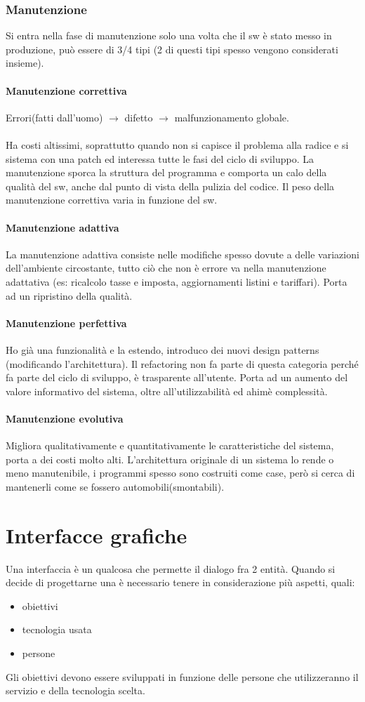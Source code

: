 \documentclass[a4paper,12pt]{report}
\begin{document}
	\subsection{Manutenzione}
	Si entra nella fase di manutenzione solo una volta che il sw è stato messo in produzione, può essere di 3/4 tipi (2 di questi tipi spesso vengono considerati insieme). 
	\subsubsection{Manutenzione correttiva}
	Errori(fatti dall’uomo) $\rightarrow$ difetto $\rightarrow$ malfunzionamento globale. \\\\
	Ha costi altissimi, soprattutto quando non si capisce il problema alla radice e si sistema con una patch ed interessa tutte le fasi del ciclo di sviluppo. La manutenzione sporca la struttura del programma e comporta un calo della qualità del sw, anche dal punto di vista della pulizia del codice. Il peso della manutenzione correttiva varia in funzione del sw.
	\subsubsection{Manutenzione adattiva}
	La manutenzione adattiva consiste nelle modifiche spesso dovute a delle variazioni dell'ambiente circostante, tutto ciò che non è errore va nella manutenzione adattativa (es: ricalcolo tasse e imposta, aggiornamenti listini e tariffari). Porta ad un ripristino della qualità.
	\subsubsection{Manutenzione perfettiva}
	Ho già una funzionalità e la estendo, introduco dei nuovi design patterns (modificando l’architettura). Il refactoring non fa parte di questa categoria perché fa parte del ciclo di sviluppo, è trasparente all’utente. Porta ad un aumento del valore informativo del sistema, oltre all'utilizzabilità ed ahimè complessità.
	\subsubsection{Manutenzione evolutiva}
	Migliora qualitativamente e quantitativamente le caratteristiche del sistema, porta a dei costi molto alti.
	L’architettura originale di un sistema lo rende o meno manutenibile, 
	i programmi spesso sono costruiti come case, però si cerca di mantenerli come se fossero automobili(smontabili).
	\chapter{Interfacce grafiche} 
	Una interfaccia è un qualcosa che permette il dialogo fra 2 entità. Quando si decide di progettarne una è necessario tenere in considerazione più aspetti, quali:
	\begin{itemize}
		\item obiettivi
		\item tecnologia usata
		\item persone
	\end{itemize}
	Gli obiettivi devono essere sviluppati in funzione delle persone che utilizzeranno il servizio e della tecnologia scelta.
\end{document}

